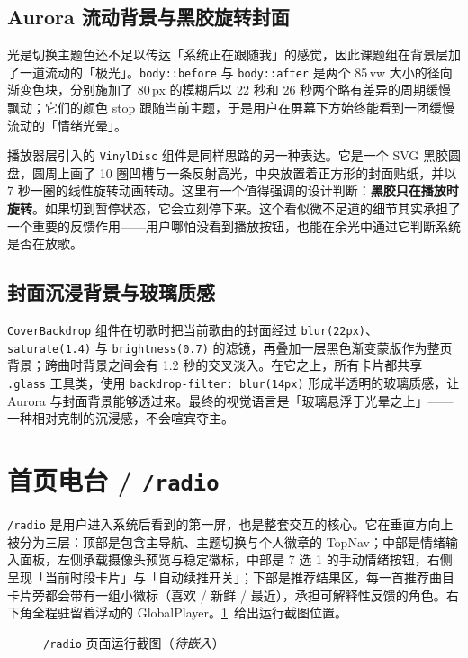 \subsection{Aurora 流动背景与黑胶旋转封面}

光是切换主题色还不足以传达「系统正在跟随我」的感觉，因此课题组在背景层加了一道流动的「极光」。\verb|body::before| 与 \verb|body::after| 是两个 85\,vw 大小的径向渐变色块，分别施加了 80\,px 的模糊后以 22 秒和 26 秒两个略有差异的周期缓慢飘动；它们的颜色 stop 跟随当前主题，于是用户在屏幕下方始终能看到一团缓慢流动的「情绪光晕」。

播放器层引入的 \texttt{VinylDisc} 组件是同样思路的另一种表达。它是一个 SVG 黑胶圆盘，圆周上画了 10 圈凹槽与一条反射高光，中央放置着正方形的封面贴纸，并以 7 秒一圈的线性旋转动画转动。这里有一个值得强调的设计判断：\textbf{黑胶只在播放时旋转}。如果切到暂停状态，它会立刻停下来。这个看似微不足道的细节其实承担了一个重要的反馈作用——用户哪怕没看到播放按钮，也能在余光中通过它判断系统是否在放歌。

\subsection{封面沉浸背景与玻璃质感}

\texttt{CoverBackdrop} 组件在切歌时把当前歌曲的封面经过 \texttt{blur(22px)}、\texttt{saturate(1.4)} 与 \texttt{brightness(0.7)} 的滤镜，再叠加一层黑色渐变蒙版作为整页背景；跨曲时背景之间会有 1.2 秒的交叉淡入。在它之上，所有卡片都共享 \texttt{.glass} 工具类，使用 \texttt{backdrop-filter: blur(14px)} 形成半透明的玻璃质感，让 Aurora 与封面背景能够透过来。最终的视觉语言是「玻璃悬浮于光晕之上」——一种相对克制的沉浸感，不会喧宾夺主。

\section{首页电台 / \texttt{/radio}}

\texttt{/radio} 是用户进入系统后看到的第一屏，也是整套交互的核心。它在垂直方向上被分为三层：顶部是包含主导航、主题切换与个人徽章的 TopNav；中部是情绪输入面板，左侧承载摄像头预览与稳定徽标，中部是 7 选 1 的手动情绪按钮，右侧呈现「当前时段卡片」与「自动续推开关」；下部是推荐结果区，每一首推荐曲目卡片旁都会带有一组小徽标（喜欢 / 新鲜 / 最近），承担可解释性反馈的角色。右下角全程驻留着浮动的 GlobalPlayer。\cref{fig:radio}~给出运行截图位置。

\begin{figure}[!htb]
  \centering
  \fbox{\rule{0pt}{6cm}\hspace{12.5cm}}
  \caption{\texttt{/radio} 页面运行截图（\textit{待嵌入}）}\label{fig:radio}
\end{figure}

